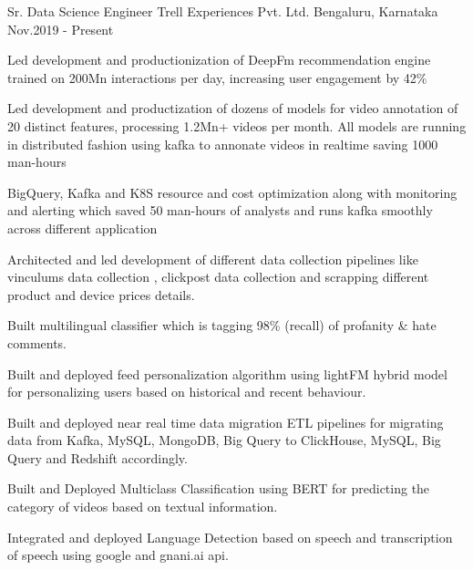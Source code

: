 



\begin{cventries}

 \cventry
    {Sr. Data Science Engineer} %
    {Trell Experiences Pvt. Ltd.} %
    {Bengaluru, Karnataka} %
    {Nov.2019 - Present} %
    { 
      \begin{cvitems} %
        \item {Led development and productionization of DeepFm recommendation engine trained on 200Mn\+ interactions per day, increasing user engagement by 42\% }
        \item {Led development and productization of dozens of models for video annotation of 20\+ distinct features, processing 1.2Mn+ videos per month. All models are running in distributed fashion using kafka to annonate videos in realtime saving 1000\+ man-hours }
        \item {BigQuery, Kafka and K8S resource and cost optimization along with monitoring and alerting which saved 50\+ man-hours of analysts and runs kafka smoothly across different application}
        \item {Architected and led development of different data collection pipelines like vinculums data collection , clickpost data collection and scrapping different product and device prices details.}
        \item {Built multilingual classifier which is tagging 98\% (recall) of profanity & hate comments. }
        \item {Built and deployed feed personalization algorithm using lightFM hybrid model for personalizing users based on historical and recent behaviour.}
        \item {Built and deployed near real time data migration ETL pipelines for migrating data from Kafka, MySQL, MongoDB, Big Query to ClickHouse, MySQL, Big Query and Redshift accordingly. }
        \item {Built and Deployed Multiclass Classification using BERT for predicting the category of videos based on textual information. }
        \item {Integrated and deployed Language Detection based on speech and transcription of speech using google and gnani.ai api. }

\end{cvitems}}
\end{cventries}
